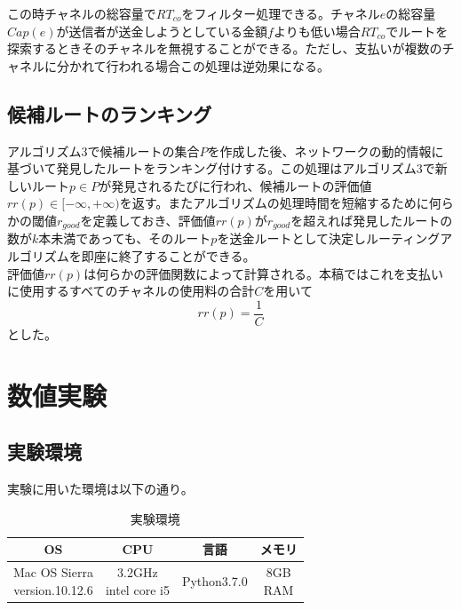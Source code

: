 \documentclass[12pt]{jarticle}
\begin{document}
この時チャネルの総容量で$RT_{co}$をフィルター処理できる。チャネル$e$の総容量$Cap(e)$が送信者が送金しようとしている金額$f$よりも低い場合$RT_{co}$でルートを探索するときそのチャネルを無視することができる。ただし、支払いが複数のチャネルに分かれて行われる場合この処理は逆効果になる。

\subsection{候補ルートのランキング}
アルゴリズム3で候補ルートの集合$P$を作成した後、ネットワークの動的情報に基づいて発見したルートをランキング付けする。この処理はアルゴリズム3で新しいルート$p\in P$が発見されるたびに行われ、候補ルートの評価値$rr(p) \in [-\infty, +\infty)$を返す。またアルゴリズムの処理時間を短縮するために何らかの閾値$r_{good}$を定義しておき、評価値$rr(p)$が$r_{good}$を超えれば発見したルートの数が$k$本未満であっても、そのルート$p$を送金ルートとして決定しルーティングアルゴリズムを即座に終了することができる。
\\
評価値$rr(p)$は何らかの評価関数によって計算される。本稿ではこれを支払いに使用するすべてのチャネルの使用料の合計$C$を用いて
\begin{equation}
rr(p) = \frac{1}{C}
\end{equation}
とした。

\section{数値実験}

\subsection{実験環境}
実験に用いた環境は以下の通り。

\begin{table}[h]
	\begin{center}
    \caption{実験環境}
		\begin{tabular}{|c|c|c|c|}
			\hline
            OS & CPU & 言語 & メモリ\\
            \hline
            \shortstack{Mac OS Sierra \\ version.10.12.6} & \shortstack{3.2GHz \\intel core i5} & Python3.7.0 & \shortstack{8GB\\RAM} \\
            \hline
		\end{tabular}
        \label{track}
	\end{center}
\end{table}
\end{document}
